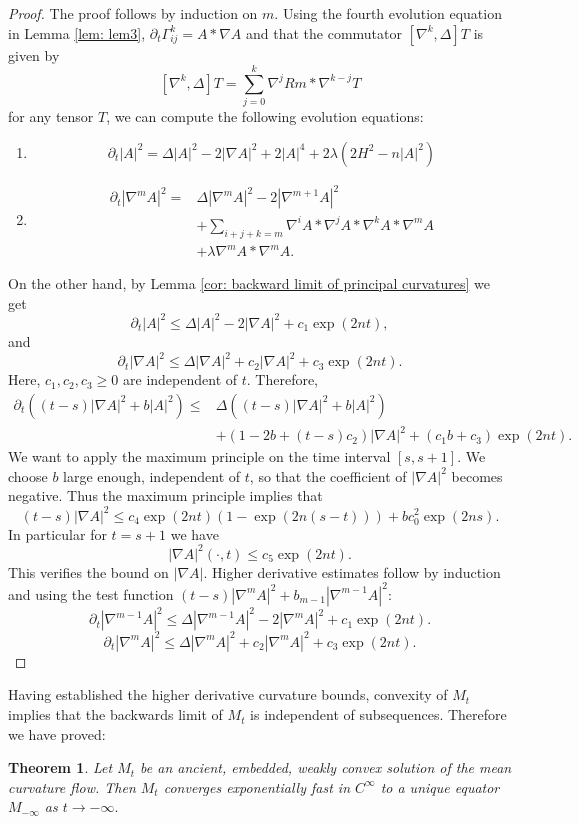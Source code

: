 \documentclass{amsart}
\newtheorem{theorem}{Theorem}
\theoremstyle{definition}
\theoremstyle{remark}
\numberwithin{equation}{section}
\begin{document}
\begin{proof}
The proof follows by induction on $m.$
Using the fourth evolution equation in Lemma \ref{lem: lem3}, $\partial_t\Gamma_{ij}^k=A\ast\nabla A$ and that the commutator $[\nabla^k,\Delta]T $ is given by
\[[\nabla^k,\Delta]T =\sum\limits_{j=0}^k\nabla^jRm\ast\nabla^{k-j}T\] for any tensor $T$, we can compute the following evolution equations:
\begin{enumerate}
  \item \[\partial_t |A|^2=\Delta |A|^2-2|\nabla A|^2+2|A|^4+2\lambda(2H^2-n|A|^2)\]
  \item \begin{align*}
  \partial_t |\nabla^mA|^2=&\Delta |\nabla^mA|^2-2 |\nabla^{m+1}A|^2\\
  &+\sum\limits_{i+j+k=m}\nabla^iA\ast\nabla^jA\ast\nabla^kA\ast\nabla^mA\\
  &+\lambda\nabla^mA\ast\nabla^mA.
         \end{align*}
\end{enumerate}
On the other hand, by Lemma \ref{cor: backward limit of principal curvatures} we get
\[\partial_t |A|^2\leq\Delta |A|^2-2|\nabla A|^2+c_1\exp(2nt),\]
and
\[\partial_t |\nabla A|^2\leq\Delta |\nabla A|^2+c_2|\nabla A|^2+c_3\exp(2nt).\]
Here, $c_1,c_2,c_3\geq0$ are independent of $t.$ Therefore,
\begin{align*}
\partial_t ((t-s)|\nabla A|^2+b|A|^2)\leq&\Delta((t-s)|\nabla A|^2+b|A|^2)\\
&+(1-2b+(t-s)c_2)|\nabla A|^2+(c_1b+c_3)\exp(2nt).
\end{align*}
We want to apply the maximum principle on the time interval $[s,s+1].$
We choose $b$ large enough, independent of $t$, so that the coefficient of $|\nabla A|^2$ becomes negative. Thus the maximum principle implies that
\[(t-s)|\nabla A|^2\leq c_4\exp(2n t)(1-\exp(2n(s-t) ))+bc_0^2 \exp(2ns).\]
In particular for $t=s+1$ we have
\[|\nabla A|^2(\cdot, t)\leq c_5\exp(2n t).\]
This verifies the bound on $|\nabla A|.$ Higher derivative estimates follow by induction and using the test function
$(t-s)|\nabla^mA|^2+b_{m-1}|\nabla^{m-1}A|^2:$
\[\partial_t |\nabla^{m-1} A|^2\leq\Delta |\nabla^{m-1} A|^2-2 |\nabla^{m}A|^2+c_1\exp(2nt).\]
\[\partial_t |\nabla^m A|^2\leq\Delta |\nabla^m A|^2+c_2|\nabla^m A|^2+c_3\exp(2nt).\]
\end{proof}
Having established the higher derivative curvature bounds, convexity of $M_t$ implies that the backwards limit of $M_t$ is independent of subsequences. Therefore we have proved:
\begin{theorem}\label{thm8}
Let $M_t$ be an ancient, embedded, weakly convex solution of the mean curvature flow. Then $M_t$ converges exponentially fast in $C^{\infty}$ to a unique equator $M_{-\infty}$ as $t\to-\infty.$
\end{theorem}
\end{document}
